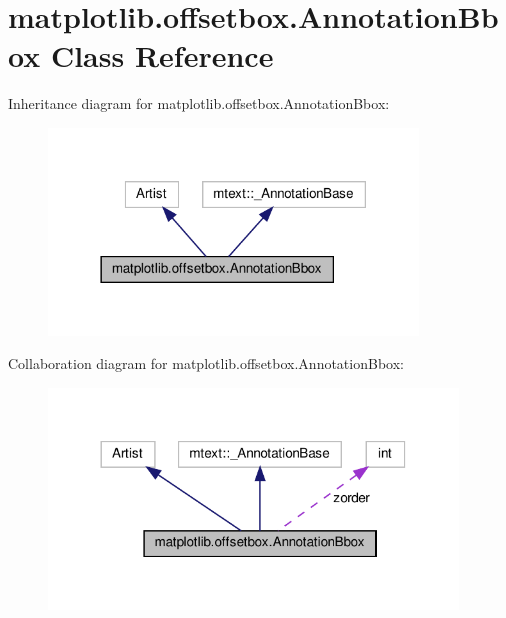 \hypertarget{classmatplotlib_1_1offsetbox_1_1AnnotationBbox}{}\section{matplotlib.\+offsetbox.\+Annotation\+Bbox Class Reference}
\label{classmatplotlib_1_1offsetbox_1_1AnnotationBbox}


Inheritance diagram for matplotlib.\+offsetbox.\+Annotation\+Bbox\+:
\nopagebreak
\begin{figure}[H]
\begin{center}
\leavevmode
\includegraphics[width=278pt]{classmatplotlib_1_1offsetbox_1_1AnnotationBbox__inherit__graph}
\end{center}
\end{figure}


Collaboration diagram for matplotlib.\+offsetbox.\+Annotation\+Bbox\+:
\nopagebreak
\begin{figure}[H]
\begin{center}
\leavevmode
\includegraphics[width=308pt]{classmatplotlib_1_1offsetbox_1_1AnnotationBbox__coll__graph}
\end{center}
\end{figure}
